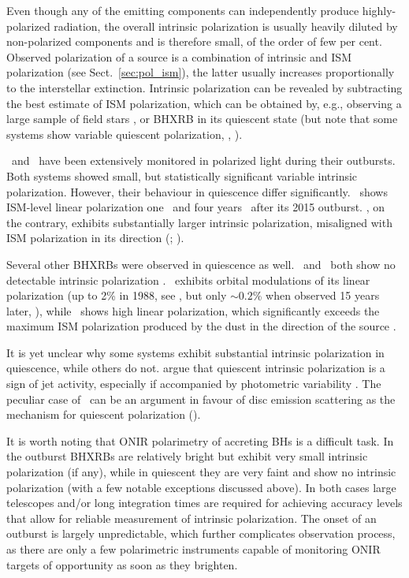 Even though any of the emitting components can independently produce highly-polarized radiation, the overall intrinsic polarization is usually heavily diluted by non-polarized components and is therefore small, of the order of few per cent.
Observed polarization of a source is a combination of intrinsic and \gls{ISM} polarization (see Sect.~\ref{sec:pol_ism}), the latter usually increases proportionally to the interstellar extinction.
Intrinsic polarization can be revealed by subtracting the best estimate of \gls{ISM} polarization, which can be obtained by, e.g., observing a large sample of field stars , or \gls{BHXRB} in its quiescent state (but note that some systems show variable quiescent polarization, \citealt{Dolan1989, Dubus2008, Russell2016}, \inprepmaxi).

\VCYG\ and \MAXI\ have been extensively monitored in polarized light during their outbursts. 
Both systems showed small, but statistically significant variable intrinsic polarization.
However, their behaviour in quiescence differ significantly.
\VCYG\ shows \gls{ISM}-level linear polarization one \paperIIp\ and four years \paperIp\ after its 2015 outburst.
\MAXI, on the contrary, exhibits substantially larger intrinsic polarization, misaligned with \gls{ISM} polarization in its direction (\paperI; \inprepmaxi).

Several other \glspl{BHXRB} were observed in quiescence as well.
\SSiv\ and \VSGR\ both show no detectable intrinsic polarization \paperIp.
\iA\ exhibits orbital modulations of its linear polarization (up to 2\% in 1988, see \citealt{Dolan1989}, but only $\sim0.2$\% when observed 15 years later, \citealt{Dubus2008}), while \SwiftJxiii\ shows high linear polarization, which significantly exceeds the maximum \gls{ISM} polarization produced by the dust in the direction of the source \citep{Russell2016}.

It is yet unclear why some systems exhibit substantial intrinsic polarization in quiescence, while others do not.
\citet{Russell2016} argue that quiescent intrinsic polarization is a sign of jet activity, especially if accompanied by photometric variability \citep{Russell2006, Gallo2007, Plotkin2016}.
The peculiar case of \MAXI\ can be an argument in favour of disc emission scattering as the mechanism for quiescent polarization (\inprepmaxi).


It is worth noting that \gls{ONIR} polarimetry of accreting \glspl{BH} is a difficult task. 
In the outburst \glspl{BHXRB} are relatively bright but exhibit very small intrinsic polarization (if any), while in quiescent they are very faint and show no intrinsic polarization (with a few notable exceptions discussed above).
In both cases large telescopes and/or long integration times are required for achieving accuracy levels that allow for reliable measurement of intrinsic polarization.
The onset of an outburst is largely unpredictable, which further complicates observation process, as there are only a few polarimetric instruments capable of monitoring \gls{ONIR} targets of opportunity as soon as they brighten.

